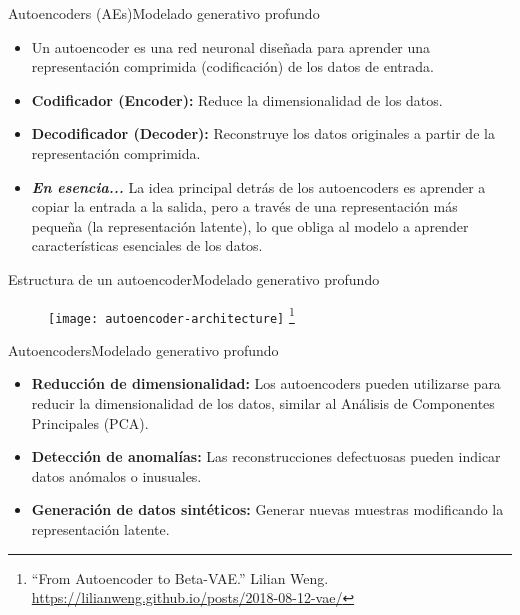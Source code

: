 \documentclass[10pt,border=3pt,tikz]{beamer}
\begin{document}
    \begin{frame}{Autoencoders (AEs)}{Modelado generativo profundo}
        \begin{itemize}
            \item Un autoencoder es una red neuronal diseñada para aprender una representación comprimida (codificación) de los datos de entrada.
            \item \textbf{Codificador (Encoder):} Reduce la dimensionalidad de los datos.
            \item \textbf{Decodificador (Decoder):} Reconstruye los datos originales a partir de la representación comprimida.
            \item \textbf{\textit{En esencia...}} La idea principal detrás de los autoencoders es aprender a copiar la entrada a la salida, pero a través de una representación más pequeña (la representación latente), lo que obliga al modelo a aprender características esenciales de los datos.
        \end{itemize}
    \end{frame}
    
    \begin{frame}{Estructura de un autoencoder}{Modelado generativo profundo}
        \begin{figure}
            \centering
            \texttt{[image: autoencoder-architecture]}
            \let\thefootnote\relax\footnote{{\tiny “From Autoencoder to Beta-VAE.” Lilian Weng. \url{https://lilianweng.github.io/posts/2018-08-12-vae/}}}
        \end{figure}
    \end{frame}
    
    \begin{frame}{Autoencoders}{Modelado generativo profundo}
        \begin{itemize}
            \item \textbf{Reducción de dimensionalidad:} Los autoencoders pueden utilizarse para reducir la dimensionalidad de los datos, similar al Análisis de Componentes Principales (PCA).
            \item \textbf{Detección de anomalías:} Las reconstrucciones defectuosas pueden indicar datos anómalos o inusuales.
            \item \textbf{Generación de datos sintéticos:} Generar nuevas muestras modificando la representación latente.
        \end{itemize}
    \end{frame}
    
\end{document}
